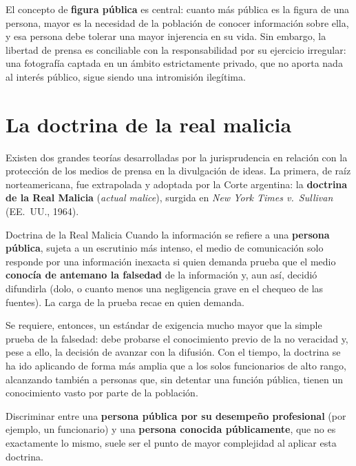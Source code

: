 \documentclass[12pt,oneside]{book}
\begin{document}
\begin{important}
El concepto de \textbf{figura pública} es central: cuanto más pública es la figura de una persona, mayor es la necesidad de la población de conocer información sobre ella, y esa persona debe tolerar una mayor injerencia en su vida. Sin embargo, la libertad de prensa es conciliable con la responsabilidad por su ejercicio irregular: una fotografía captada en un ámbito estrictamente privado, que no aporta nada al interés público, sigue siendo una intromisión ilegítima.
\end{important}

\section{La doctrina de la real malicia}

Existen dos grandes teorías desarrolladas por la jurisprudencia en relación con la protección de los medios de prensa en la divulgación de ideas. La primera, de raíz norteamericana, fue extrapolada y adoptada por la Corte argentina: la \textbf{doctrina de la Real Malicia} (\emph{actual malice}), surgida en \emph{New York Times v.\ Sullivan} (EE.\ UU., 1964).

\begin{definition}{Doctrina de la Real Malicia}
Cuando la información se refiere a una \textbf{persona pública}, sujeta a un escrutinio más intenso, el medio de comunicación solo responde por una información inexacta si quien demanda prueba que el medio \textbf{conocía de antemano la falsedad} de la información y, aun así, decidió difundirla (dolo, o cuanto menos una negligencia grave en el chequeo de las fuentes). La carga de la prueba recae en quien demanda.
\end{definition}

Se requiere, entonces, un estándar de exigencia mucho mayor que la simple prueba de la falsedad: debe probarse el conocimiento previo de la no veracidad y, pese a ello, la decisión de avanzar con la difusión. Con el tiempo, la doctrina se ha ido aplicando de forma más amplia que a los solos funcionarios de alto rango, alcanzando también a personas que, sin detentar una función pública, tienen un conocimiento vasto por parte de la población.

\begin{important}
Discriminar entre una \textbf{persona pública por su desempeño profesional} (por ejemplo, un funcionario) y una \textbf{persona conocida públicamente}, que no es exactamente lo mismo, suele ser el punto de mayor complejidad al aplicar esta doctrina.
\end{important}
\end{document}
